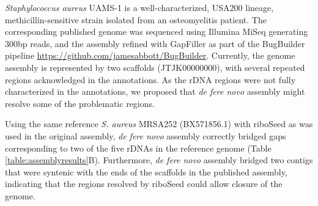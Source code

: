 \documentclass[a4,center,fleqn]{NAR}
\begin{document}

\textit{Staphylococcus aureus} UAMS-1 is a well-characterized, USA200 lineage, methicillin-sensitive strain isolated from an osteomyelitis patient. The corresponding published genome was sequenced using Illumina MiSeq generating 300bp reads, and the assembly refined with GapFiller as part of the BugBuilder pipeline \url{https://github.com/jamesabbott/BugBuilder}. Currently, the genome assembly is represented by two scaffolds (JTJK00000000), with several repeated regions acknowledged in the annotations\cite{Sassi2015}. As the rDNA regions were not fully characterized in the annotations, we proposed that \textit{de fere novo} assembly might resolve some of the problematic regions.

Using the same reference \textit{S. aureus} MRSA252\cite{Holden2004} (BX571856.1) with riboSeed as was used in the original assembly, \textit{de fere novo} assembly correctly bridged gaps corresponding to two of the five rDNAs in the reference genome (Table \ref{table:assemblyresults}B). Furthermore, \textit{de fere novo} assembly bridged two contigs that were syntenic with the ends of the scaffolds in the published assembly, indicating that the regions resolved by riboSeed could allow closure of the genome.
\end{document}
